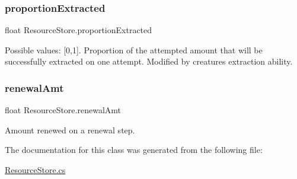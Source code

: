 \subsubsection{\texorpdfstring{proportion\+Extracted}{proportionExtracted}}
{\footnotesize\ttfamily float Resource\+Store.\+proportion\+Extracted}



Possible values\+: \mbox{[}0,1\mbox{]}. Proportion of the attempted amount that will be successfully extracted on one attempt. Modified by creature\textquotesingle{}s extraction ability. 

\mbox{\label{class_resource_store_a0f9723ce7385fb03909eeea64c38fdbb}} 
\subsubsection{\texorpdfstring{renewal\+Amt}{renewalAmt}}
{\footnotesize\ttfamily float Resource\+Store.\+renewal\+Amt}



Amount renewed on a renewal step. 



The documentation for this class was generated from the following file\+:\begin{DoxyCompactItemize}
\item 
\mbox{\hyperlink{_resource_store_8cs}{Resource\+Store.\+cs}}\end{DoxyCompactItemize}
